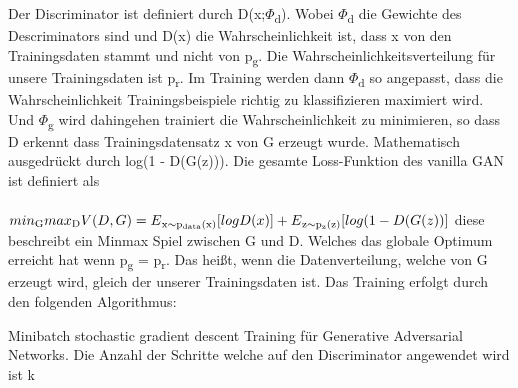 \documentclass{llncs}
\begin{document}
Der Discriminator ist definiert durch D(x;$\Phi$\textsubscript{d}). Wobei $\Phi$\textsubscript{d} die Gewichte des Descriminators sind und D(x) die Wahrscheinlichkeit ist, dass x von den Trainingsdaten stammt und nicht von p\textsubscript{g}. Die Wahrscheinlichkeitsverteilung für unsere Trainingsdaten ist p\textsubscript{r}.  Im Training werden dann $\Phi$\textsubscript{d} so angepasst, dass die Wahrscheinlichkeit Trainingsbeispiele richtig zu klassifizieren maximiert wird. Und $\Phi$\textsubscript{g} wird dahingehen trainiert die Wahrscheinlichkeit zu minimieren, so dass D erkennt dass Trainingsdatensatz x von G erzeugt wurde. Mathematisch ausgedrückt durch log(1 - D(G(z))). Die gesamte Loss-Funktion des vanilla GAN ist definiert als
\\\\
\begin{math}
min\textsubscript{G} max\textsubscript{D}V(D,G)=E\textsubscript{x$\sim$p\textsubscript{data}(x)}[logD(x)]  + E\textsubscript{z$\sim$p\textsubscript{z}(z)}[log(1-D(G(z))]
\\\\             
\end{math}
diese beschreibt ein Minmax Spiel zwischen G und D. Welches das globale Optimum erreicht hat wenn p\textsubscript{g} = p\textsubscript{r}. Das heißt, wenn die Datenverteilung, welche von G erzeugt wird, gleich der unserer Trainingsdaten ist\cite{goodfellow2014}. Das Training erfolgt durch den folgenden Algorithmus:
\\
\begin{algorithm}[H]
		\caption{Minibatch stochastic gradient descent Training für Generative Adversarial Networks. Die Anzahl der Schritte welche auf den Discriminator angewendet wird ist k }	
\end{algorithm}
\end{document}
